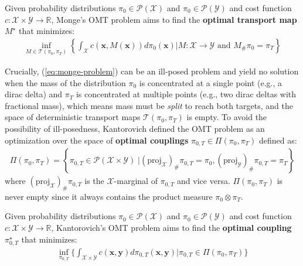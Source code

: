 \documentclass{article}
\begin{document}
\begin{definition}
    Given probability distributions $\pi_0\in \mathcal{P}(\mathcal{X})$ and $\pi_0\in \mathcal{P}(\mathcal{Y})$ and cost function $c: \mathcal{X}\times \mathcal{Y}\to\mathbb{R}$, Monge's OMT problem aims to find the \textbf{optimal transport map} $M^\star$ that minimizes:
    \begin{align}
    \inf_{M\in \mathcal{T}(\pi_0, \pi_T)}\left\{\int_{\mathcal{X}}c(\boldsymbol{x}, M(\boldsymbol{x}))d\pi_0(\boldsymbol{x})\bigg|M:\mathcal{X}\to \mathcal{Y}\text{ and }M_{\#}\pi_0=\pi_T\right\}\tag{Monge's OMT Problem}\label{eq:monge-problem}
    \end{align}
\end{definition}
Crucially, (\ref{eq:monge-problem}) can be an ill-posed problem and yield no solution when the mass of the distribution $\pi_0$ is concentrated at a single point (e.g., a dirac delta) and $\pi_T$ is concentrated at multiple points (e.g., two dirac deltas with fractional mass), which means mass must be \textit{split} to reach both targets, and the space of deterministic transport maps $\mathcal{T}(\pi_0, \pi_T)$ is empty. To avoid the possibility of ill-posedness, Kantorovich defined the OMT problem as an optimization over the space of \textbf{optimal couplings} $\pi_{0,T}\in \Pi(\pi_0, \pi_T)$ defined as: 
\begin{align}
    \Pi(\pi_0, \pi_T)=\left\{\pi_{0,T}\in\mathcal{P}( \mathcal{X}\times \mathcal{Y})\;\big|(\text{proj}_{\mathcal{X}})_{\#}\pi_{0,T}=\pi_0, (\text{proj}_{\mathcal{Y}})_{\#}\pi_{0,T}=\pi_T\right\}\label{eq:space-of-couplings}  
\end{align}
where $(\text{proj}_{\mathcal{X}})_{\#}\pi_{0,T}$ is the $\mathcal{X}$-marginal of $\pi_{0,T}$ and vice versa. $\Pi(\pi_0, \pi_T)$ is never empty since it always contains the product measure $\pi_0\otimes \pi_T$. 

\begin{definition}
    Given probability distributions $\pi_0\in \mathcal{P}(\mathcal{X})$ and $\pi_0\in \mathcal{P}(\mathcal{Y})$ and cost function $c: \mathcal{X}\times \mathcal{Y}\to\mathbb{R}$, Kantorovich's OMT problem aims to find the \textbf{optimal coupling} $\pi^\star_{0,T}$ that minimizes:
    \begin{align}
    \inf_{\pi_{0,T}}\bigg\{\int_{\mathcal{X}\times \mathcal{Y}}c(\boldsymbol{x}, \boldsymbol{y})d\pi_{0,T}(\boldsymbol{x}, \boldsymbol{y})\bigg|\pi_{0,T}\in \Pi(\pi_0, \pi_T)\bigg\}\tag{Kantorovich's OMT Problem}\label{eq:kant-omt-problem}
    \end{align}
\end{definition}
\end{document}
